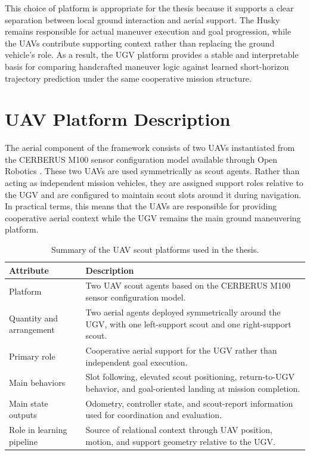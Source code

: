 This choice of platform is appropriate for the thesis because it supports a clear separation between local ground interaction and aerial support. The Husky remains responsible for actual maneuver execution and goal progression, while the UAVs contribute supporting context rather than replacing the ground vehicle's role. As a result, the UGV platform provides a stable and interpretable basis for comparing handcrafted maneuver logic against learned short-horizon trajectory prediction under the same cooperative mission structure.

\section{UAV Platform Description}

The aerial component of the framework consists of two UAVs instantiated from the CERBERUS M100 sensor configuration model available through Open Robotics \citeauthor{openrobotics2023m100} \citep{openrobotics2023m100}. These two UAVs are used symmetrically as scout agents. Rather than acting as independent mission vehicles, they are assigned support roles relative to the UGV and are configured to maintain scout slots around it during navigation. In practical terms, this means that the UAVs are responsible for providing cooperative aerial context while the UGV remains the main ground maneuvering platform.

\begin{table}[tbp]
    \caption{Summary of the UAV scout platforms used in the thesis.}
    \label{tab:uav_platform_summary}
    \centering
    \begin{tabularx}{\textwidth}{@{}>{\raggedright\arraybackslash}p{}X@{}}
        \toprule
        \textbf{Attribute} & \textbf{Description} \\
        \midrule
        Platform & Two UAV scout agents based on the CERBERUS M100 sensor configuration model. \\
        Quantity and arrangement & Two aerial agents deployed symmetrically around the UGV, with one left-support scout and one right-support scout. \\
        Primary role & Cooperative aerial support for the UGV rather than independent goal execution. \\
        Main behaviors & Slot following, elevated scout positioning, return-to-UGV behavior, and goal-oriented landing at mission completion. \\
        Main state outputs & Odometry, controller state, and scout-report information used for coordination and evaluation. \\
        Role in learning pipeline & Source of relational context through UAV position, motion, and support geometry relative to the UGV. \\
        \bottomrule
    \end{tabularx}
\end{table}

